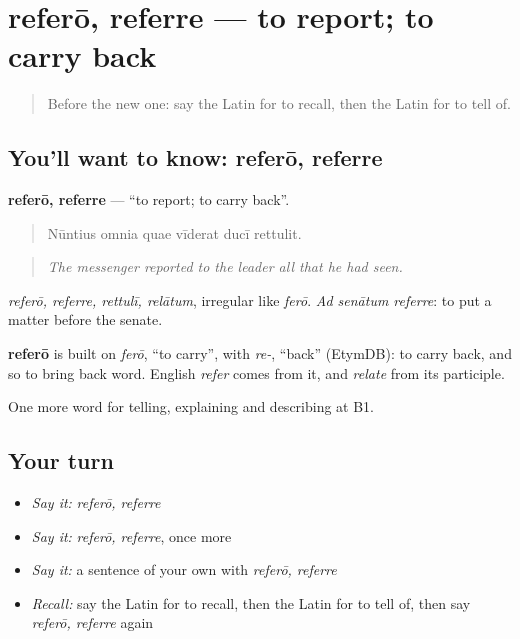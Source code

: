 \section[referō, referre]{referō, referre — to report; to carry back}

\label{lesson:LA-C299-refero}



\begin{quote}
Before the new one: say the Latin for to recall, then the Latin for to tell of.
\end{quote}

\subsection*{You'll want to know: referō, referre}
\textbf{referō, referre} — \textquotedblleft{}to report; to carry back\textquotedblright{}.

\begin{quote}
Nūntius omnia quae vīderat ducī rettulit.
\end{quote}

\begin{quote}
\emph{The messenger reported to the leader all that he had seen.}
\end{quote}

\emph{referō, referre, rettulī, relātum}, irregular like \emph{ferō}. \emph{Ad senātum referre}: to put a matter before the senate.

\begin{cousinweb}
\textbf{referō} is built on \emph{ferō}, \textquotedblleft{}to carry\textquotedblright{}, with \emph{re-}, \textquotedblleft{}back\textquotedblright{} (EtymDB): to carry back, and so to bring back word. English \emph{refer} comes from it, and \emph{relate} from its participle.
\end{cousinweb}

\begin{grammarlens}[title={What you've built}]
One more word for telling, explaining and describing at B1.
\end{grammarlens}

\subsection*{Your turn}
\begin{itemize}
\raggedright
  \item \emph{Say it:} \emph{referō, referre}
  \item \emph{Say it:} \emph{referō, referre}, once more
  \item \emph{Say it:} a sentence of your own with \emph{referō, referre}
  \item \emph{Recall:} say the Latin for to recall, then the Latin for to tell of, then say \emph{referō, referre} again
\end{itemize}

